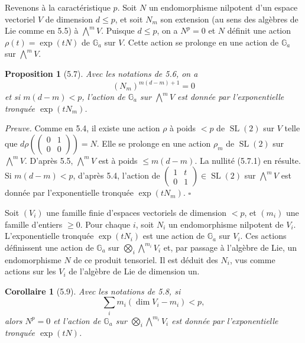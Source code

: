 \documentclass[10pt]{article}
\newcommand{\Ga}{\mathbb G_a}
\newcommand{\SL}{\operatorname{SL}}
\theoremstyle{deligne}
\newtheorem*{proposition*}{Proposition}
\newtheorem*{corollary*}{Corollaire}
\newenvironment{proofdel}{\textit{Preuve.}}{\hfill$\square$}
\newcommand{\heading}[1]{\vspace{0.7em}\noindent{\bfseries #1}\quad}
\begin{document}
\heading{5.6.}
Revenons à la caractéristique \(p\). Soit \(N\) un endomorphisme nilpotent d'un espace vectoriel \(V\) de dimension \(d\le p\), et soit \(N_m\) son extension (au sens des algèbres de Lie comme en 5.5) à \(\bigwedge^m V\). Puisque \(d\le p\), on a \(N^p=0\) et \(N\) définit une action \(\rho(t)=\exp(tN)\) de \(\Ga\) sur \(V\). Cette action se prolonge en une action de \(\Ga\) sur \(\bigwedge^m V\).

\begin{proposition*}[5.7]
Avec les notations de 5.6, on a
\[
\tag{5.7.1}
  (N_m)^{m(d-m)+1}=0
\]
et si \(m(d-m)<p\), l'action de \(\Ga\) sur \(\bigwedge^m V\) est donnée par l'exponentielle tronquée \(\exp(tN_m)\).
\end{proposition*}

\begin{proofdel}
Comme en 5.4, il existe une action \(\rho\) à poids \(<p\) de \(\SL(2)\) sur \(V\) telle que \(d\rho(\begin{pmatrix}0&1\\0&0\end{pmatrix})=N\). Elle se prolonge en une action \(\rho_m\) de \(\SL(2)\) sur \(\bigwedge^m V\). D'après 5.5, \(\bigwedge^m V\) est à poids \(\le m(d-m)\). La nullité (5.7.1) en résulte. Si \(m(d-m)<p\), d'après 5.4, l'action de \(\begin{pmatrix}1&t\\0&1\end{pmatrix}\in\SL(2)\) sur \(\bigwedge^m V\) est donnée par l'exponentielle tronquée \(\exp(tN_m)\).
\end{proofdel}

\heading{5.8.}
Soit \((V_i)\) une famille finie d'espaces vectoriels de dimension \(<p\), et \((m_i)\) une famille d'entiers \(\ge0\). Pour chaque \(i\), soit \(N_i\) un endomorphisme nilpotent de \(V_i\). L'exponentielle tronquée \(\exp(tN_i)\) est une action de \(\Ga\) sur \(V_i\). Ces actions définissent une action de \(\Ga\) sur \(\bigotimes_i\bigwedge^{m_i}V_i\) et, par passage à l'algèbre de Lie, un endomorphisme \(N\) de ce produit tensoriel. Il est déduit des \(N_i\), vus comme actions sur les \(V_i\) de l'algèbre de Lie de dimension un.

\begin{corollary*}[5.9]
Avec les notations de 5.8, si
\[
\tag{5.9.1}
  \sum_i m_i(\dim V_i-m_i)<p,
\]
alors \(N^p=0\) et l'action de \(\Ga\) sur \(\bigotimes_i\bigwedge^{m_i}V_i\) est donnée par l'exponentielle tronquée \(\exp(tN)\).
\end{corollary*}
\end{document}
